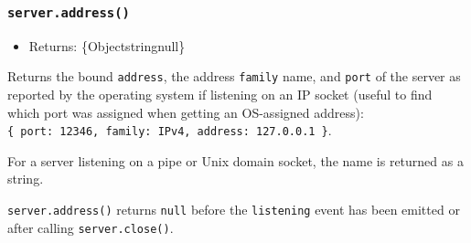 \subsubsection{\texorpdfstring{\texttt{server.address()}}{server.address()}}\label{server.address}

\begin{itemize}
\tightlist
\item
  Returns: \{Object\textbar string\textbar null\}
\end{itemize}

Returns the bound \texttt{address}, the address \texttt{family} name,
and \texttt{port} of the server as reported by the operating system if
listening on an IP socket (useful to find which port was assigned when
getting an OS-assigned address):
\texttt{\{\ port:\ 12346,\ family:\ \textquotesingle{}IPv4\textquotesingle{},\ address:\ \textquotesingle{}127.0.0.1\textquotesingle{}\ \}}.

For a server listening on a pipe or Unix domain socket, the name is
returned as a string.

\begin{Shaded}
\begin{Highlighting}[]
\OperatorTok{=}\KeywordTok{=\textgreater{}}\NormalTok{ \{}
\NormalTok{(}\StringTok{\textquotesingle{}}\NormalTok{)}\OperatorTok{;}
\NormalTok{\})}\NormalTok{(}\OperatorTok{,}\KeywordTok{=\textgreater{}}\NormalTok{ \{}
  \OperatorTok{;}
\NormalTok{\})}\OperatorTok{;}

\NormalTok{(() }\KeywordTok{=\textgreater{}}\NormalTok{ \{}
  \NormalTok{(}\OperatorTok{,}\NormalTok{())}\OperatorTok{;}
\NormalTok{\})}\OperatorTok{;}
\end{Highlighting}
\end{Shaded}

\texttt{server.address()} returns \texttt{null} before the
\texttt{\textquotesingle{}listening\textquotesingle{}} event has been
emitted or after calling \texttt{server.close()}.

